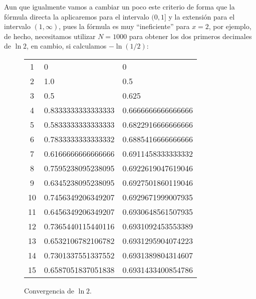 \documentclass[11pt,oneside,a4paper]{book}
\begin{document}
Aun que igualmente vamos a cambiar un poco este criterio de forma que la fórmula directa la aplicaremos para el intervalo $(0,1]$ y la extensión para el intervalo $(1,\infty)$, pues la fórmula es muy ``ineficiente'' para $x=2$, por ejemplo, de hecho, necesitamos utilizar $N=1000$ para obtener los dos primeros decimales de $\ln 2$, en cambio, si calculamos $-\ln(1/2)$:
\begin{figure}
\centering
\begin{tabular}{|c|ll|}
1 & 0 & 0 \\
2 & 1.0 & 0.5 \\
3 & 0.5 & 0.625 \\
4 & 0.8333333333333333 & 0.6666666666666666 \\
5 & 0.5833333333333333 & 0.6822916666666666 \\
6 & 0.7833333333333332 & 0.6885416666666666 \\
7 & 0.6166666666666666 & 0.6911458333333332 \\
8 & 0.7595238095238095 & 0.6922619047619046 \\
9 & 0.6345238095238095 & 0.6927501860119046 \\
10 & 0.7456349206349207 & 0.6929671999007935 \\
11 & 0.6456349206349207 & 0.6930648561507935 \\
12 & 0.7365440115440116 & 0.6931092453553389 \\
13 & 0.6532106782106782 & 0.6931295904074223 \\
14 & 0.7301337551337552 & 0.6931389804314607 \\
15 & 0.6587051837051838 & 0.6931433400854786
\end{tabular}
\caption{Convergencia de $\ln 2$.}
\end{figure}
\end{document}
